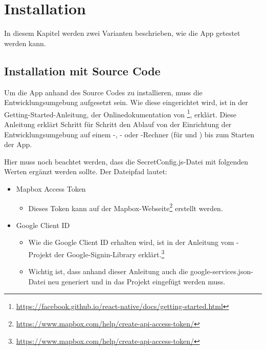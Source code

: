 \chapter{Installation}
\label{pd-installation}

In diesem Kapitel werden zwei Varianten beschrieben, wie die App getestet werden kann. 


\section{Installation mit Source Code}
Um die App anhand des Source Codes zu installieren, muss die  Entwicklungsumgebung aufgesetzt sein. 
Wie diese eingerichtet wird, ist in der Getting-Started-Anleitung, der Onlinedokumentation von \footnote{\url{https://facebook.github.io/react-native/docs/getting-started.html}}, erklärt.
Diese Anleitung erklärt Schritt für Schritt den Ablauf von der Einrichtung der Entwicklungsumgebung auf einem -, - oder -Rechner (für  und ) bis zum Starten der App.

Hier muss noch beachtet werden, dass die SecretConfig.js-Datei mit folgenden Werten ergänzt werden sollte.
Der Dateipfad lautet: \newline

\begin{itemize}
	\item Mapbox Access Token
	\begin{itemize}
		\item Dieses Token kann auf der Mapbox-Webseite\footnote{\url{https://www.mapbox.com/help/create-api-access-token/}} erstellt werden.
	\end{itemize}
	
	\item Google Client ID 
	\begin{itemize}
		\item Wie die Google Client ID erhalten wird, ist in der Anleitung vom -Projekt der Google-Signin-Library erklärt.\footnote{\url{https://www.mapbox.com/help/create-api-access-token/}}
		\item Wichtig ist, dass anhand dieser Anleitung auch die google-services.json-Datei neu generiert und in das Projekt eingefügt werden muss.
	\end{itemize}
\end{itemize}

